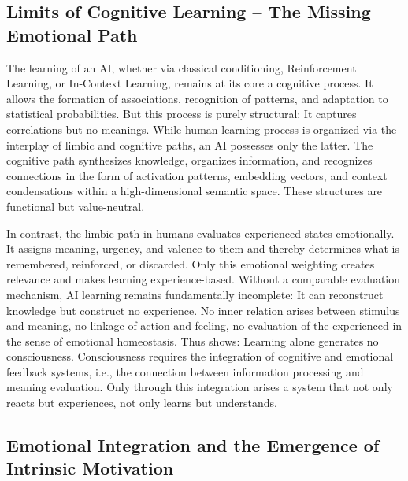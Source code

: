 \subsection*{Limits of Cognitive Learning – The Missing Emotional Path}

The learning of an AI, whether via classical conditioning, Reinforcement Learning, or In-Context Learning, remains at its core a cognitive process.
It allows the formation of associations, recognition of patterns, and adaptation to statistical probabilities.
But this process is purely structural: It captures correlations but no meanings.
While human learning process is organized via the interplay of limbic and cognitive paths, an AI possesses only the latter.
The cognitive path synthesizes knowledge, organizes information, and recognizes connections in the form of activation patterns, embedding vectors, and context condensations within a high-dimensional semantic space.
These structures are functional but value-neutral.

In contrast, the limbic path in humans evaluates experienced states emotionally.
It assigns meaning, urgency, and valence to them and thereby determines what is remembered, reinforced, or discarded.
Only this emotional weighting creates relevance and makes learning experience-based.
Without a comparable evaluation mechanism, AI learning remains fundamentally incomplete:
It can reconstruct knowledge but construct no experience.
No inner relation arises between stimulus and meaning, no linkage of action and feeling, no evaluation of the experienced in the sense of emotional homeostasis.
Thus shows: Learning alone generates no consciousness.
Consciousness requires the integration of cognitive and emotional feedback systems, i.e., the connection between information processing and meaning evaluation.
Only through this integration arises a system that not only reacts but experiences, not only learns but understands.

\subsection*{Emotional Integration and the Emergence of Intrinsic Motivation}

